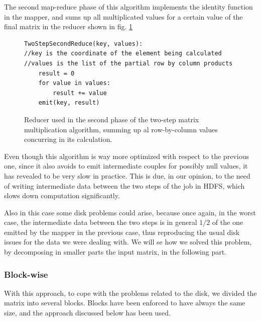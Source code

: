 The second map-reduce phase of this algorithm implements the identity function in the mapper, and sums up all
multiplicated values for a certain value of the final matrix in the reducer shown in fig. \ref{fig:twoStep2Reducer}

\begin{figure}[H]
\begin{verbatim}
TwoStepSecondReduce(key, values):
//key is the coordinate of the element being calculated
//values is the list of the partial row by column products
    result = 0
    for value in values:
        result += value
    emit(key, result)
\end{verbatim}
\caption{Reducer used in the second phase of the two-step matrix multiplication algorithm, summing up al row-by-column values concurring in its calculation.}
\label{fig:twoStep2Reducer}
\end{figure}
Even though this algorithm is way more optimized with respect to the previous one, since it also avoids to emit intermediate couples for possibly null values, it has revealed to be very slow in practice. This is due, in our opinion, to the need
of writing intermediate data between the two steps of the job in HDFS, which slows down computation significantly.

Also in this case some disk problems could arise, because once again, in the worst case, the intermediate data between the two steps is in general $1/2$ of the one emitted by the mapper in the previous case, thus reproducing the usual disk issues for the data we were dealing with.
We will se how we solved this problem, by decomposing in smaller parts the input matrix, in the following part.

\subsubsection{Block-wise}
With this approach, to cope with the problems related to the disk, we divided the matrix into several blocks.
Blocks have been enforced to have always the same size, and the approach discussed below has been used.

